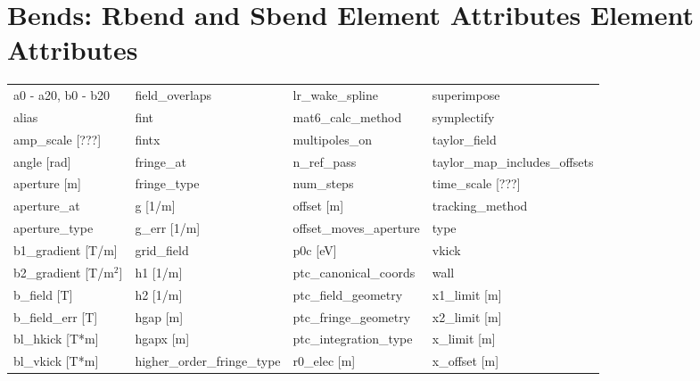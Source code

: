  \section{Bends: Rbend and Sbend Element Attributes Element Attributes}
 \label{s:list.bend}
 
 \begin{tabular}{llll} \toprule
a0 - a20, b0 - b20             & field_overlaps                 & lr_wake_spline                 & superimpose                    \\
alias                          & fint                           & mat6_calc_method               & symplectify                    \\
amp_scale [???]                & fintx                          & multipoles_on                  & taylor_field                   \\
angle [rad]                    & fringe_at                      & n_ref_pass                     & taylor_map_includes_offsets    \\
aperture [m]                   & fringe_type                    & num_steps                      & time_scale [???]               \\
aperture_at                    & g [1/m]                        & offset [m]                     & tracking_method                \\
aperture_type                  & g_err [1/m]                    & offset_moves_aperture          & type                           \\
b1_gradient [T/m]              & grid_field                     & p0c [eV]                       & vkick                          \\
b2_gradient [T/m$^2$]          & h1 [1/m]                       & ptc_canonical_coords           & wall                           \\
b_field [T]                    & h2 [1/m]                       & ptc_field_geometry             & x1_limit [m]                   \\
b_field_err [T]                & hgap [m]                       & ptc_fringe_geometry            & x2_limit [m]                   \\
bl_hkick [T*m]                 & hgapx [m]                      & ptc_integration_type           & x_limit [m]                    \\
bl_vkick [T*m]                 & higher_order_fringe_type       & r0_elec [m]                    & x_offset [m]                   \\

\end{tabular}
